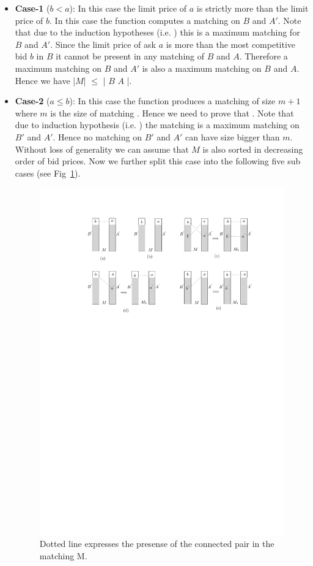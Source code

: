 \documentclass[a4paper,UKenglish,cleveref, autoref]{lipics-v2019}
\begin{document}
\begin{itemize}
\item \textbf{Case-1} ($b<a$): In this case the limit price of $a$ is strictly more than the limit price of $b$.  In this case the function  computes a matching on $B$ and $A'$. Note that due to the induction hypotheses (i.e. ) this is a maximum matching for $B$ and $A'$. Since the limit price of ask $a$ is more than the most competitive bid $b$ in $B$ it cannot be present in any matching of $B$ and $A$. Therefore a maximum matching on $B$ and $A'$ is also a maximum matching on $B$ and $A$. Hence we have |$M$| $\leq$ |  $B$ $A$ |.
\item \textbf{Case-2} ($a \leq b$): In this case the function  produces a matching of size $m + 1$ where $m$ is the size of matching .  Hence we need to prove that . Note that due to induction hypothesis (i.e. ) the matching  is a maximum matching on $B'$ and $A'$.  Hence no matching on $B'$ and $A'$ can have size bigger than $m$. Without loss of generality we can assume that $M$ is also sorted in decreasing order of bid prices. Now we further split this case into the following five sub cases (see Fig~\ref{fig:mmProof}).

\begin{figure}[h!]
\centering
\includegraphics[width=1\textwidth]{mm_proof.pdf}
\caption{Dotted line expresses the presense of the connected pair in the matching M. }
\label{fig:mmProof}
\end{figure}


\end{itemize}
\end{document}
